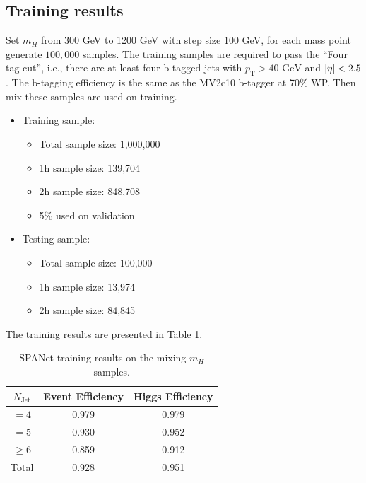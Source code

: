\documentclass[12pt]{article}
\begin{document}
	\subsection{Training results}%
	\label{sub:training_results_mix}
		Set $m_H$ from 300 GeV to 1200 GeV with step size 100 GeV, for each mass point generate $100,000$ samples. The training samples are required to pass the ``Four tag cut'', i.e., there are at least four b-tagged jets with $p_{\text{T}} > \text{40 GeV}$ and $\abs{\eta} < 2.5$. The b-tagging efficiency is the same as the MV2c10 b-tagger at 70\% WP. Then mix these samples are used on training. 
		\begin{itemize}
			\item Training sample:
			\begin{itemize}
				\item Total sample size: 1,000,000
				\item 1h sample size: 139,704
				\item 2h sample size: 848,708
				\item 5\% used on validation
			\end{itemize}
			\item Testing sample: 
			\begin{itemize}
				\item Total sample size: 100,000
				\item 1h sample size: 13,974
				\item 2h sample size: 84,845
			\end{itemize}
		\end{itemize}
		The training results are presented in Table \ref{tab:SPANet_diHiggs_4btag_pt40_mix_resonant}.
		\begin{table}[htpb]
			\centering
			\caption{SPANet training results on the mixing $m_H$ samples.}
			\label{tab:SPANet_diHiggs_4btag_pt40_mix_resonant}
			\begin{tabular}{c|cc}
				$N_\text{Jet}$ & Event Efficiency & Higgs Efficiency \\
				\hline
				$=4$	  &      0.979              &    0.979             \\
				$=5$	  &      0.930              &    0.952             \\
				$\ge 6$	  &      0.859              &    0.912             \\
				\hline
				Total	  &      0.928              &    0.951             \\
			\end{tabular}
		\end{table}
		
\end{document}
